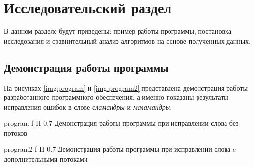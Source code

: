 \chapter{Исследовательский раздел}

В данном разделе будут приведены: пример работы программы, постановка исследования и сравнительный анализ алгоритмов на основе полученных данных.

\section{Демонстрация работы программы}


На рисунках \ref{img:program} и \ref{img:program2} представлена демонстрация работы разработанного программного обеспечения, а именно показаны результаты исправления ошибок в слове \textit{сламандры} и \textit{маламандры}.  

{program} %
{f} %
{H} %
{0.7\textwidth} %
{Демонстрация работы программы при исправлении слова без потоков} %

{program2} %
{f} %
{H} %
{0.7\textwidth} %
{Демонстрация работы программы при исправлении слова c дополнительными потоками} %

